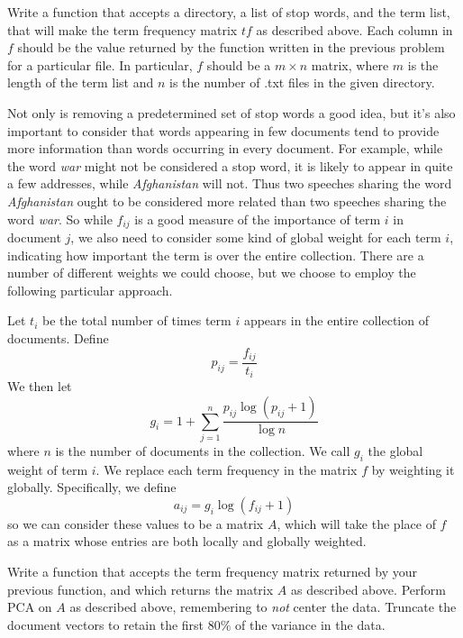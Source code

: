 \begin{problem}
Write a function that accepts a directory, a list of stop words, and the term list, 
that will make the term frequency matrix $t\!f$ as described above. 
Each column in $f$ should be the value returned by the function written in the 
previous problem for a particular file. In particular, $f$ should be a 
$m \times n$ matrix, where $m$ is the length of the term list and 
$n$ is the number of .txt files in the given directory.
\end{problem}

Not only is removing a predetermined set of stop words a good idea, 
but it's also important to consider that words appearing in few documents tend 
to provide more information than words occurring in every document. 
For example, while the word \emph{war} might not be considered a stop word, 
it is likely to appear in quite a few addresses, while \emph{Afghanistan} will not. 
Thus two speeches sharing the word \emph{Afghanistan} ought to be considered more 
related than two speeches sharing the word \emph{war}. 
So while $f_{ij}$ is a good measure of the importance of term $i$ in document $j$, 
we also need to consider some kind of global weight for each term $i$, 
indicating how important the term is over the entire collection. 
There are a number of different weights we could choose, but we choose to employ 
the following particular approach.

Let $t_{i}$ be the total number of times term $i$ appears in the entire 
collection of documents. 
Define 
\begin{equation*}
p_{ij} = \frac{f_{ij}}{t_{i}}
\end{equation*}
We then let 
\begin{equation*}
g_{i} = 1 + \sum_{j=1}^{n} \frac{p_{ij} \log (p_{ij} + 1)}{\log n}
\end{equation*}
where $n$ is the number of documents in the collection. 
We call $g_{i}$ the global weight of term $i$. 
We replace each term frequency in the matrix $f$ by weighting it globally. 
Specifically, we define 
\begin{equation*}
a_{ij} = g_{i} \log (f_{ij} + 1)
\end{equation*}
so we can consider these values to be a matrix $A$, which will take the place of 
$f$ as a matrix whose entries are both locally and globally weighted.

\begin{problem}
Write a function that accepts the term frequency matrix returned by your previous 
function, and which returns the matrix $A$ as described above. 
Perform PCA on $A$ as described above, remembering to \emph{not} center the data. 
Truncate the document vectors to retain the first $80\%$ of the variance in the data.
\end{problem}

